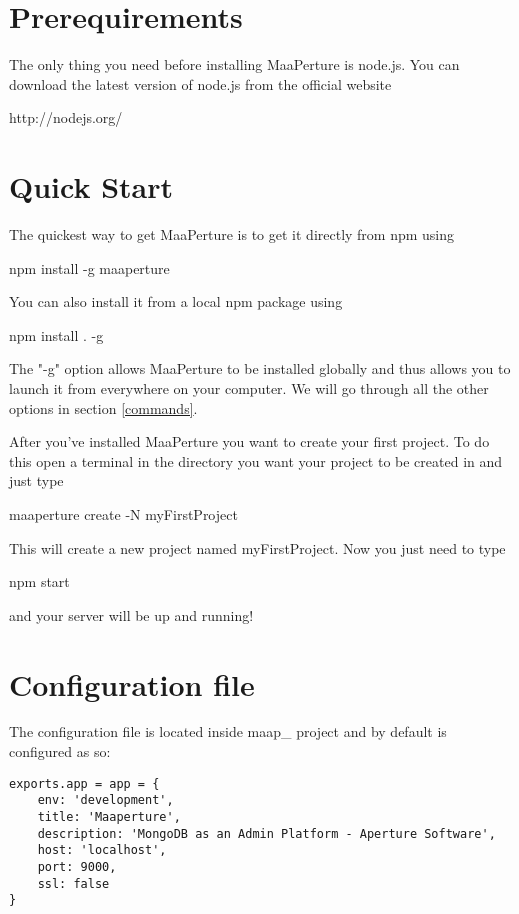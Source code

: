 \section{Prerequirements}
The only thing you need before installing MaaPerture is node.js.
You can download the latest version of node.js from the official website
\begin{center}
http://nodejs.org/
\end{center}

\section{Quick Start}
The quickest way to get MaaPerture is to get it directly from npm using
\begin{center}
npm install -g maaperture
\end{center}

You can also install it from a local npm package using 
\begin{center}
npm install . -g
\end{center}

The "-g" option allows MaaPerture to be installed globally and thus allows you to launch it from everywhere on your computer.
We will go through all the other options in section \ref{commands}.

After you've installed MaaPerture you want to create your first project.
To do this open a terminal in the directory you want your project to be created in and just type
\begin{center}
 maaperture create -N myFirstProject
\end{center}

This will create a new project named myFirstProject.
Now you just need to type
\begin{center}
npm start
\end{center}

and your server will be up and running!




\newpage
\section{Configuration file}

The configuration file is located inside   maap\_ project and by default is configured as so:


\begin{lstlisting}
exports.app = app = {
	env: 'development',
	title: 'Maaperture',
	description: 'MongoDB as an Admin Platform - Aperture Software',
	host: 'localhost',
	port: 9000,
	ssl: false
}

\end{lstlisting}

